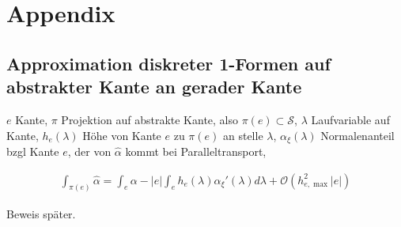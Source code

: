 \documentclass[a4paper,11pt]{scrartcl}
\newcommand{\surf}{\mathcal{S}} %
\begin{document}
    

\section{Appendix}

\subsection{Approximation diskreter 1-Formen auf abstrakter Kante an gerader Kante} \label{sec:approxOneForm}

\( e \) Kante, 
\( \pi \) Projektion auf abstrakte Kante, also \( \pi(e)\subset\surf \), 
\( \lambda \) Laufvariable auf Kante,
\(h_{e}(\lambda)  \) Höhe von Kante \( e \) zu \( \pi(e) \) an stelle \( \lambda \),
\( \alpha_{\xi}(\lambda) \) Normalenanteil bzgl Kante \( e \), der von \( \hat{\alpha} \) kommt bei Paralleltransport,

\begin{align}\label{eq:approxOneForm}
  \int_{\pi(e)}\hat{\alpha} = \int_{e}\alpha - |e|\int_{e}h_{e}(\lambda)\alpha_{\xi}'(\lambda)d\lambda + \mathcal{O}(h^{2}_{e,\max}|e|)
\end{align}

Beweis später.




\end{document}
